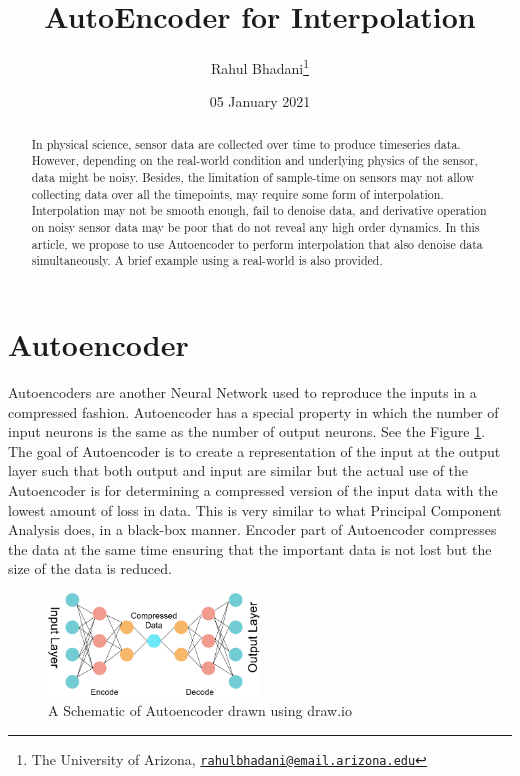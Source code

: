 \documentclass[onecolumn]{article}
\title{AutoEncoder for Interpolation}
\author{Rahul Bhadani\footnote{The University of Arizona,
  \href{mailto:rahulbhadani@email.arizona.edu}{\nolinkurl{rahulbhadani@email.arizona.edu}}}}
\date{05 January 2021}
\begin{document}
\maketitle
\begin{abstract}
In physical science, sensor data are collected over time to produce
timeseries data. However, depending on the real-world condition and
underlying physics of the sensor, data might be noisy. Besides, the
limitation of sample-time on sensors may not allow collecting data over
all the timepoints, may require some form of interpolation.
Interpolation may not be smooth enough, fail to denoise data, and
derivative operation on noisy sensor data may be poor that do not reveal
any high order dynamics. In this article, we propose to use Autoencoder
to perform interpolation that also denoise data simultaneously. A brief
example using a real-world is also provided.
\end{abstract}

\section{Autoencoder}\label{autoencoder}

Autoencoders \citep{ballard1987modular} are another Neural Network used
to reproduce the inputs in a compressed fashion. Autoencoder has a
special property in which the number of input neurons is the same as the
number of output neurons. See the Figure \ref{neuralnet}. The goal of
Autoencoder is to create a representation of the input at the output
layer such that both output and input are similar but the actual use of
the Autoencoder is for determining a compressed version of the input
data with the lowest amount of loss in data. This is very similar to
what Principal Component Analysis does, in a black-box manner. Encoder
part of Autoencoder compresses the data at the same time ensuring that
the important data is not lost but the size of the data is reduced.

\begin{figure}
\centering
\includegraphics[width=0.50000\textwidth]{neuralnet.png}
\caption{A Schematic of Autoencoder drawn using
draw.io\label{neuralnet}}
\end{figure}
\end{document}
